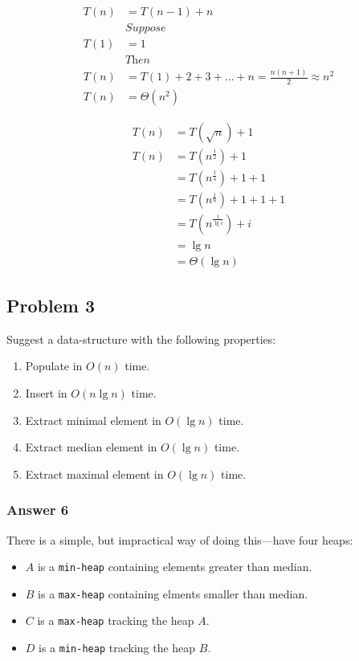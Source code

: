 \documentclass[11pt]{article}
\begin{document}
\begin{align*}
  T(n) &= T(n - 1) + n \\
  &\textit{Suppose} \\
  T(1) &= 1 \\
  &\textit{Then} \\
  T(n) &= T(1) + 2 + 3 + \dots + n = \frac{n(n + 1)}{2} \approx n^2 \\
  T(n) &= \Theta(n^2)
\end{align*}


\begin{align*}
  T(n) &= T(\sqrt{n}) + 1 \\
  T(n) &= T(n^{\frac{1}{2}}) + 1 \\
       &= T(n^{\frac{1}{4}}) + 1 + 1 \\
       &= T(n^{\frac{1}{8}}) + 1 + 1 + 1 \\
       &= T(n^{\frac{1}{\lg i}}) + i \\
       &= \lg n \\
       &= \Theta(\lg n)
\end{align*}

\subsection{Problem 3}
\label{sec:orgheadline10}
Suggest a data-structure with the following properties:
\begin{enumerate}
\item Populate in \(O(n)\) time.
\item Insert in \(O(n \lg n)\) time.
\item Extract minimal element in \(O(\lg n)\) time.
\item Extract median element in \(O(\lg n)\) time.
\item Extract maximal element in \(O(\lg n)\) time.
\end{enumerate}

\subsubsection{Answer 6}
\label{sec:orgheadline9}
There is a simple, but impractical way of doing this---have four heaps:
\begin{itemize}
\item \(A\) is a \texttt{min-heap} containing elements greater than median.
\item \(B\) is a \texttt{max-heap} containing elments smaller than median.
\item \(C\) is a \texttt{max-heap} tracking the heap \(A\).
\item \(D\) is a \texttt{min-heap} tracking the heap \(B\).
\end{itemize}
\end{document}
